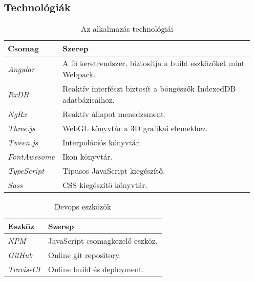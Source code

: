 \subsection{Technológiák}

\begin{table}[H]
	\centering
	\begin{tabular}{ | m{} | m{} | }
		\hline
		\textbf{Csomag} & \textbf{Szerep} \\
		\hline \hline
		\emph{Angular} \cite{Angular} & A fő keretrendszer, biztosítja a build eszközöket mint Webpack. \\
		\hline
		\emph{RxDB} \cite{RxDB} & Reaktív interfészt biztosít a böngészők IndexedDB adatbázisaihoz. \\
		\hline
		\emph{NgRx} \cite{NgRx} & Reaktív állapot menedzsment. \\
		\hline
		\emph{Three.js} \cite{Three} & WebGL könyvtár a 3D grafikai elemekhez. \\
		\hline
		\emph{Tween.js} \cite{Tween} & Interpolációs könyvtár. \\
		\hline
		\emph{FontAwesome} \cite{FontAwesome} & Ikon könyvtár.  \\
		\hline
		\emph{TypeScript} \cite{TypeScript} & Típusos JavaScript kiegészítő.  \\
		\hline

		\emph{Sass} \cite{Sass} & CSS kiegészítő könyvtár.  \\
		\hline
	\end{tabular}
	\caption{Az alkalmazás technológiái}
	\label{tab:technologies}
\end{table}

\begin{table}[H]
	\centering
	\begin{tabular}{ | m{} | m{} | }
		\hline
		\textbf{Eszköz} & \textbf{Szerep} \\
		\hline \hline
		\emph{NPM} \cite{NPM} & JavaScript csomagkezelő eszköz.  \\
		\hline
		\emph{GitHub} \cite{Github} & Online git repository.  \\
		\hline
		\emph{Travis-CI} \cite{Travis} & Online build és deployment.  \\
		\hline
	\end{tabular}
	\caption{Devops eszközök}
	\label{tab:technologies}
\end{table}
